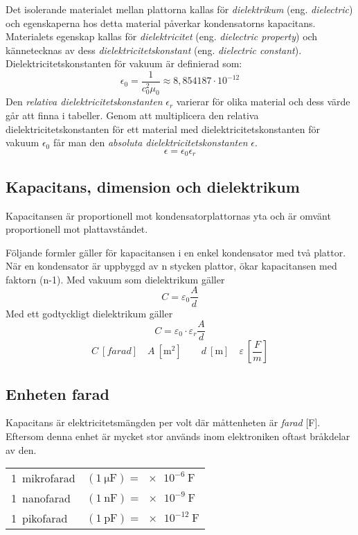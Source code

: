 Det isolerande materialet mellan plattorna kallas för \emph{dielektrikum}
(eng. \emph{dielectric}) och egenskaperna hos detta material påverkar
kondensatorns kapacitans.
Materialets egenskap kallas för \emph{dielektricitet}
(eng. \emph{dielectric property}) och kännetecknas av dess
\emph{dielektricitetskonstant} (eng. \emph{dielectric constant}).
Dielektricitetskonstanten för vakuum är definierad som:
\[\epsilon_0 = \dfrac{1}{c_0^2\mu_0} \approx 8,854187 \cdot 10^{-12}\]
Den \emph{relativa dielektricitetskonstanten} \(\epsilon_r\) varierar för olika material och dess värde 
går att finna i tabeller. Genom att multiplicera den relativa dielektricitetskonstanten 
för ett material med dielektricitetskonstanten för vakuum \(\epsilon_0\) får man den
\emph{absoluta dielektricitetskonstanten} \(\epsilon\).
\[\epsilon = \epsilon_0\epsilon_r\]

\newpage %

\subsection{Kapacitans, dimension och dielektrikum}

Kapacitansen är proportionell mot kondensatorplattornas yta och är omvänt 
proportionell mot plattavståndet.

Följande formler gäller för kapacitansen i en enkel kondensator med två
plattor. När en kondensator är uppbyggd av n stycken plattor, ökar kapacitansen
med faktorn (n-1).
Med vakuum som dielektrikum gäller
\[C = \varepsilon _0 \dfrac{A}{d}\]
Med ett godtyckligt dielektrikum gäller
\[C = \varepsilon _0 \cdot \varepsilon _r \frac{A}{d}\]
\[C\ [\textit{farad}]\quad A\ [\si{\metre\squared}]\qquad d\ [\si{\metre}]\quad \varepsilon\ [\dfrac{F}{m}]\]

\subsection{Enheten farad}

Kapacitans är elektricitetsmängden per volt där måttenheten är \emph{farad} [F].
Eftersom denna enhet är mycket stor används inom elektroniken oftast bråkdelar
av den.

\begin{center}
\begin{tabular}{ll}
1~mikrofarad & \((\SI{1}{\micro\farad}) = \SI{e-6}{\farad}\) \\
1~nanofarad & \((\SI{1}{\nano\farad}) = \SI{e-9}{\farad}\) \\
1~pikofarad & \((\SI{1}{\pico\farad}) = \SI{e-12}{\farad}\) \\
\end{tabular}
\end{center}

